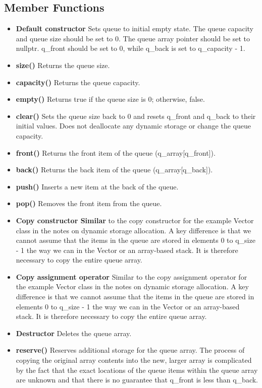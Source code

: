 \documentclass{report}
\begin{document}
\subsection{Member Functions}
    \begin{itemize}
        \item \textbf{Default constructor} Sets queue to initial empty state. The queue capacity and queue size should be set to 0. The queue array pointer should be set to nullptr. q\_front should be set to 0, while q\_back is set to q\_capacity - 1.
        \item \textbf{size()} Returns the queue size.
        \item \textbf{capacity()} Returns the queue capacity.
        \item \textbf{empty()} Returns true if the queue size is 0; otherwise, false.
        \item \textbf{clear()} Sets the queue size back to 0 and resets q\_front and q\_back to their initial values. Does not deallocate any dynamic storage or change the queue capacity.
        \item \textbf{front()} Returns the front item of the queue (q\_array[q\_front]).
        \item \textbf{back()} Returns the back item of the queue (q\_array[q\_back]).
        \item \textbf{push()} Inserts a new item at the back of the queue.
        \item \textbf{pop()} Removes the front item from the queue.
        \item \textbf{Copy constructor Similar} to the copy constructor for the example Vector class in the notes on dynamic storage allocation. A key difference is that we cannot assume that the items in the queue are stored in elements 0 to q\_size - 1 the way we can in the Vector or an array-based stack. It is therefore necessary to copy the entire queue array.
        \item \textbf{Copy assignment operator} Similar to the copy assignment operator for the example Vector class in the notes on dynamic storage allocation. A key difference is that we cannot assume that the items in the queue are stored in elements 0 to q\_size - 1 the way we can in the Vector or an array-based stack. It is therefore necessary to copy the entire queue array.
        \item \textbf{Destructor} Deletes the queue array.
        \item \textbf{reserve()} Reserves additional storage for the queue array. The process of copying the original array contents into the new, larger array is complicated by the fact that the exact locations of the queue items within the queue array are unknown and that there is no guarantee that q\_front is less than q\_back.
    \end{itemize}
\end{document}
